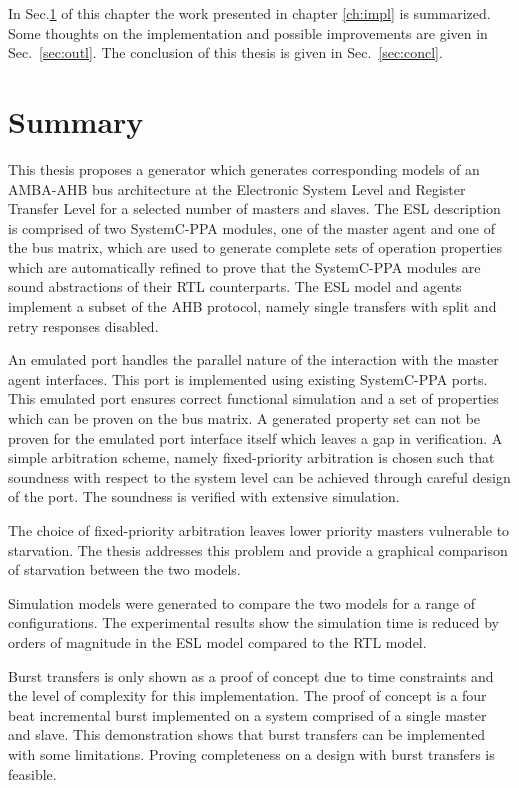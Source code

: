 In Sec.\ref{sec:sum} of this chapter the work presented in chapter \ref{ch:impl} is summarized. Some thoughts on the implementation and possible improvements are given in Sec.~\ref{sec:outl}. The conclusion of this thesis is given in Sec.~\ref{sec:concl}.

\section{Summary}
\label{sec:sum}
This thesis proposes a generator which generates corresponding models of an AMBA-AHB bus architecture at the Electronic System Level and Register Transfer Level for a selected number of masters and slaves. The ESL description is comprised of two SystemC-PPA modules, one of the master agent and one of the bus matrix, which are used to generate complete sets of operation properties which are automatically refined to prove that the SystemC-PPA modules are sound abstractions of their RTL counterparts. The ESL model and agents implement a subset of the AHB protocol, namely single transfers with split and retry responses disabled. \par
An emulated port handles the parallel nature of the interaction with the master agent interfaces. This port is implemented using existing SystemC-PPA ports. This emulated port ensures correct functional simulation and a set of properties which can be proven on the bus matrix. A generated property set can not be proven for the emulated port interface itself which leaves a gap in verification. A simple arbitration scheme, namely fixed-priority arbitration is chosen such that soundness with respect to the system level can be achieved through careful design of the port. The soundness is verified with extensive simulation. \par
The choice of fixed-priority arbitration leaves lower priority masters vulnerable to starvation. The thesis addresses this problem and provide a graphical comparison of starvation between the two models. \par
Simulation models were generated to compare the two models for a range of configurations. The experimental results show the simulation time is reduced by orders of magnitude in the ESL model compared to the RTL model. \par 
Burst transfers is only shown as a proof of concept due to time constraints and the level of complexity for this implementation. The proof of concept is a four beat incremental burst implemented on a system comprised of a single master and slave. This demonstration shows that burst transfers can be implemented with some limitations. Proving completeness on a design with burst transfers is feasible. \par
 

